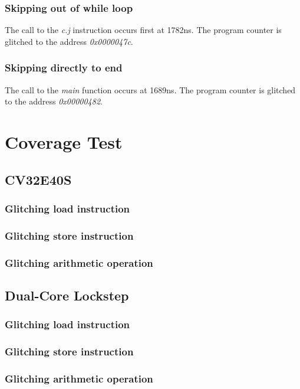 \subsubsection{Skipping out of while loop}

The call to the \textit{c.j} instruction occurs first at 1782ns. The program counter is glitched to the address \textit{0x0000047c}.

\subsubsection{Skipping directly to end}

The call to the \textit{main} function occurs at 1689ns. The program counter is glitched to the address \textit{0x00000482}.


\section{Coverage Test}
\label{sec:cov_test_result}

\subsection{CV32E40S}

\subsubsection{Glitching load instruction}

\subsubsection{Glitching store instruction}

\subsubsection{Glitching arithmetic operation}

\subsection{Dual-Core Lockstep}

\subsubsection{Glitching load instruction}

\subsubsection{Glitching store instruction}

\subsubsection{Glitching arithmetic operation}

